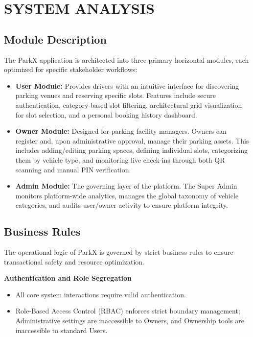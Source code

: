 \chapter{SYSTEM ANALYSIS}

\section{Module Description}
The ParkX application is architected into three primary horizontal modules, each optimized for specific stakeholder workflows:

\begin{itemize}
    \item \textbf{User Module:} Provides drivers with an intuitive interface for discovering parking venues and reserving specific slots. Features include secure authentication, category-based slot filtering, architectural grid visualization for slot selection, and a personal booking history dashboard.
    \item \textbf{Owner Module:} Designed for parking facility managers. Owners can register and, upon administrative approval, manage their parking assets. This includes adding/editing parking spaces, defining individual slots, categorizing them by vehicle type, and monitoring live check-ins through both QR scanning and manual PIN verification.
    \item \textbf{Admin Module:} The governing layer of the platform. The Super Admin monitors platform-wide analytics, manages the global taxonomy of vehicle categories, and audits user/owner activity to ensure platform integrity.
\end{itemize}

\section{Business Rules}
The operational logic of ParkX is governed by strict business rules to ensure transactional safety and resource optimization.

\textbf{Authentication and Role Segregation}
\begin{itemize}
    \item All core system interactions require valid authentication.
    \item Role-Based Access Control (RBAC) enforces strict boundary management; Administrative settings are inaccessible to Owners, and Ownership tools are inaccessible to standard Users.
\end{itemize}

